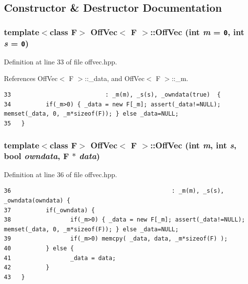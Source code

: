 \subsection{Constructor \& Destructor Documentation}
\subsubsection{\setlength{\rightskip}{0pt plus 5cm}template$<$class F$>$ {\bf Off\-Vec}$<$ F $>$::{\bf Off\-Vec} (int {\em m} = {\tt 0}, int {\em s} = {\tt 0})\hspace{0.3cm}{\tt  [inline]}}\label{classOffVec_76b14ffefdbc8961768fd1b04254a596_76b14ffefdbc8961768fd1b04254a596}




Definition at line 33 of file offvec.hpp.

References Off\-Vec$<$ F $>$::\_\-data, and Off\-Vec$<$ F $>$::\_\-m.

\footnotesize\begin{verbatim}33                           : _m(m), _s(s), _owndata(true)  {
34          if(_m>0) { _data = new F[_m]; assert(_data!=NULL); memset(_data, 0, _m*sizeof(F)); } else _data=NULL;
35   }
\end{verbatim}\normalsize 


\subsubsection{\setlength{\rightskip}{0pt plus 5cm}template$<$class F$>$ {\bf Off\-Vec}$<$ F $>$::{\bf Off\-Vec} (int {\em m}, int {\em s}, bool {\em owndata}, F $\ast$ {\em data})\hspace{0.3cm}{\tt  [inline]}}\label{classOffVec_a895c8bf0f988f27929952c0e1fcbcce_a895c8bf0f988f27929952c0e1fcbcce}




Definition at line 36 of file offvec.hpp.

\footnotesize\begin{verbatim}36                                              : _m(m), _s(s), _owndata(owndata) {
37          if(_owndata) {
38                 if(_m>0) { _data = new F[_m]; assert(_data!=NULL); memset(_data, 0, _m*sizeof(F)); } else _data=NULL;
39                 if(_m>0) memcpy( _data, data, _m*sizeof(F) );
40          } else {
41                 _data = data;
42          }
43   }
\end{verbatim}\normalsize 


